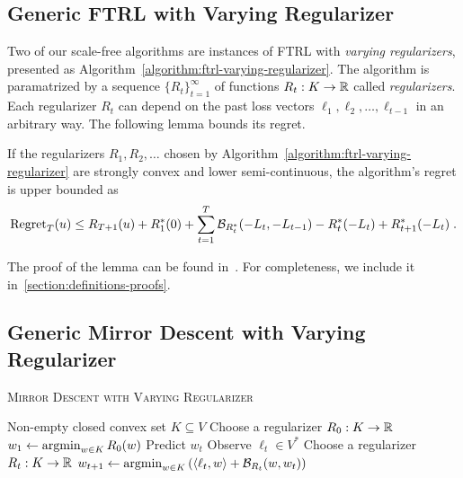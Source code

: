 \subsection{Generic FTRL with Varying Regularizer}
\label{section:generic-ftrl}

Two of our scale-free algorithms are instances of \textsc{FTRL} with
\emph{varying regularizers}, presented as
Algorithm~\ref{algorithm:ftrl-varying-regularizer}.  The algorithm is
paramatrized by a sequence $\{R_t\}_{t=1}^\infty$ of functions $R_t:K \to \mathbb{R}$
called \emph{regularizers}.  Each regularizer $R_t$ can depend on the past loss
vectors $\ell_1, \ell_2, \dots, \ell_{t-1}$ in an arbitrary way.  The following
lemma bounds its regret.

\begin{lemma}
\label{lemma:generic-regret-bound}
If the regularizers $R_1, R_2, \dots$ chosen by
Algorithm~\ref{algorithm:ftrl-varying-regularizer} are strongly convex and lower
semi-continuous, the algorithm's regret is upper bounded as
$$
\operatorname{Regret}_T(u) \le R_{T+1}(u) + R_1^*(0) + \sum_{t=1}^{T} \mathcal{B}_{R_t^*}(-L_t, -L_{t-1}) - R_t^*(-L_t) + R_{t+1}^*(-L_t) \; .
$$
\end{lemma}

The proof of the lemma can be found in~\cite{Orabona-Crammer-Cesa-Bianchi-2014}.
For completeness, we include it in~\ref{section:definitions-proofs}.


\subsection{Generic Mirror Descent with Varying Regularizer}

\begin{algorithm}[t]
\caption{\textsc{Mirror Descent with Varying Regularizer}}
\label{algorithm:mirror-descent-varying-regularizer}
\begin{algorithmic}[1]
\REQUIRE Non-empty closed convex set $K \subseteq V$
\STATE Choose a regularizer $R_0:K \to \mathbb{R}$
\STATE $w_1 \leftarrow \operatorname*{argmin}_{w \in K} R_0(w)$
\STATE Predict $w_t$
\STATE Observe $\ell_t \in V^*$
\STATE Choose a regularizer $R_t:K \to \mathbb{R}$
\STATE $w_{t+1} \leftarrow \operatorname*{argmin}_{w \in K} \left( \langle \ell_t, w \rangle + \mathcal{B}_{R_t}(w, w_t) \right)$
\ENDFOR
\end{algorithmic}
\end{algorithm}

